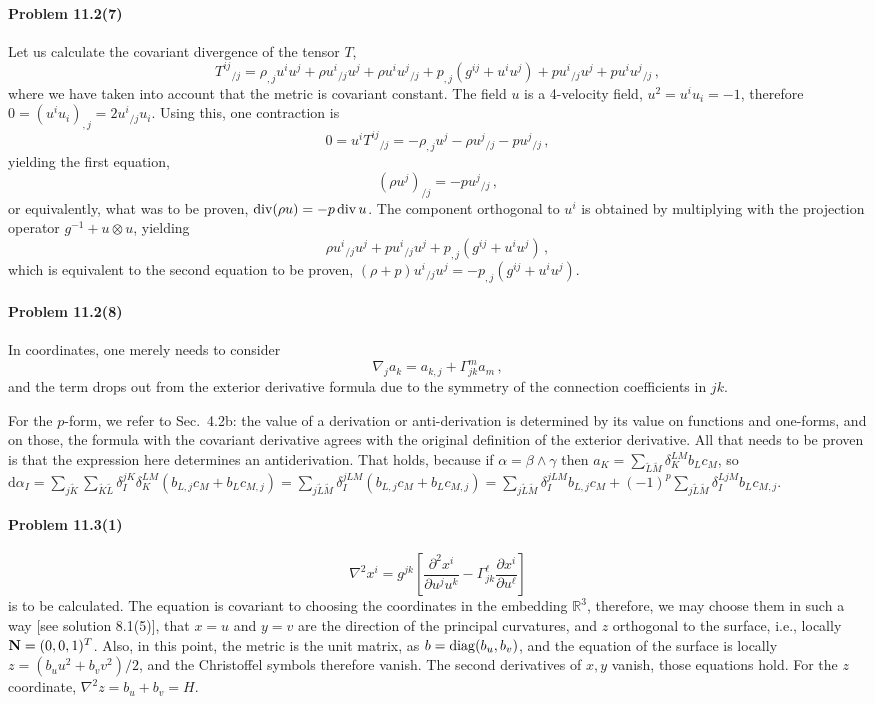 \documentclass[a4paper,12pt]{article}
\def\d{\mathrm{d}}
\newcommand{\problem}[1]{\paragraph{Problem #1}}
\begin{document}

\problem{11.2(7)} Let us calculate the covariant divergence of the tensor $T$,
\[
 T^{ij}{}_{/j} = \rho_{,j}u^i u^j + \rho u^i{}_{/j}u^j + \rho u^i u^j{}_{/j} + p_{,j}(g^{ij}+u^iu^j) +p u^i{}_{/j}u^j +pu^i u^j{}_{/j}\,,
\]
where we have taken into account that the metric is covariant constant. The field $u$ is a 4-velocity field, $u^2=u^iu_i =-1$, therefore $0=(u^iu_i)_{,j} = 2u^i{}_{/j} u_i$. Using this, one contraction is
\[
 0 = u^i T^{ij}{}_{/j} = -\rho_{,j}u^j - \rho u^j{}_{/j} - pu^j{}_{/j}\,,
\]
yielding the first equation,
\[
 (\rho u^j)_{/j} = -p u^j{}_{/j}\,,
\]
or equivalently, what was to be proven, $\mathop{\rm div}(\rho u)=-p\mathop{\rm div}u$. The component orthogonal to $u^i$ is obtained by multiplying with the projection operator $g^{-1} + u\otimes u$, yielding
\[
 \rho u^i{}_{/j}u^j + pu^i{}_{/j}u^j + p_{,j}(g^{ij}+u^iu^j)\,,
\]
which is equivalent to the second equation to be proven, $(\rho + p)u^i{}_{/j}u^j = -p_{,j}(g^{ij}+u^iu^j)$.


\problem{11.2(8)} In coordinates, one merely needs to consider
\[
 \nabla_j a_k = a_{k,j} + \Gamma^m_{jk}a_m\,,
\]
and the term drops out from the exterior derivative formula due to the symmetry of the connection coefficients in $jk$.

For the $p$-form, we refer to Sec.\ 4.2b: the value of a derivation or anti-derivation is determined by its value on functions and one-forms, and on those, the formula with the covariant derivative agrees with the original definition of the exterior derivative. All that needs to be proven is that the expression here determines an antiderivation. That holds, because if $\alpha=\beta\wedge \gamma$ then $a_K = \sum_{\underrightarrow{L}\underrightarrow{M}}\delta_K^{LM} b_L c_M$, so $\d\alpha_I = \sum_{j\underrightarrow{K}}\sum_{\underrightarrow{K}\underrightarrow{L}}\delta^{jK}_I\delta_K^{LM} (b_{L,j}c_M + b_L c_{M,j}) = \sum_{j\underrightarrow{L}\underrightarrow{M}}\delta^{jLM}_I (b_{L,j}c_M + b_L c_{M,j}) = \sum_{j\underrightarrow{L}\underrightarrow{M}}\delta^{jLM}_I b_{L,j}c_M + (-1)^p \sum_{j\underrightarrow{L}\underrightarrow{M}}\delta^{LjM}_I  b_L c_{M,j}$.


\problem{11.3(1)}
\[
 \nabla^2 x^i = g^{jk}\left[ \frac{\partial^2 x^i}{\partial u^j u^k} -\Gamma^\ell_{jk}\frac{\partial x^i}{\partial u^\ell}\right]
\]
is to be calculated. The equation is covariant to choosing the coordinates in the embedding $\mathbb{R}^3$, therefore, we may choose them in such a way [see solution 8.1(5)], that $x=u$ and $y=v$ are the direction of the principal curvatures, and $z$ orthogonal to the surface, i.e., locally ${\bf N}=(0, 0, 1)^T$. Also, in this point, the metric is the unit matrix, as $b= {\rm diag}(b_u, b_v)$, and the equation of the surface is locally $z=(b_u u^2 + b_v v^2)/2$, and the Christoffel symbols therefore vanish. The second derivatives of $x,y$ vanish, those equations hold. For the $z$ coordinate,
$\nabla^2 z = b_u + b_v = H$.
\end{document}
